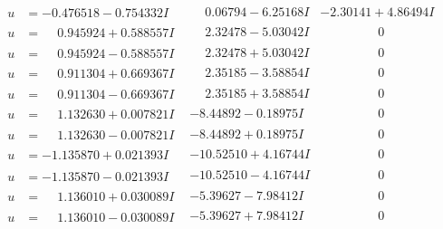 \documentclass[1p]{elsarticle_modified}
\theoremstyle{definition}
\begin{document}
$$\begin{array}{c|c|c}
\begin{aligned}
u &= -0.476518 - 0.754332 I\end{aligned}
 & \phantom{-}0.06794 - 6.25168 I & -2.30141 + 4.86494 I \\ \hline\begin{aligned}
u &= \phantom{-}0.945924 + 0.588557 I\end{aligned}
 & \phantom{-}2.32478 - 5.03042 I & \phantom{-0.000000 } 0 \\ \hline\begin{aligned}
u &= \phantom{-}0.945924 - 0.588557 I\end{aligned}
 & \phantom{-}2.32478 + 5.03042 I & \phantom{-0.000000 } 0 \\ \hline\begin{aligned}
u &= \phantom{-}0.911304 + 0.669367 I\end{aligned}
 & \phantom{-}2.35185 - 3.58854 I & \phantom{-0.000000 } 0 \\ \hline\begin{aligned}
u &= \phantom{-}0.911304 - 0.669367 I\end{aligned}
 & \phantom{-}2.35185 + 3.58854 I & \phantom{-0.000000 } 0 \\ \hline\begin{aligned}
u &= \phantom{-}1.132630 + 0.007821 I\end{aligned}
 & -8.44892 - 0.18975 I & \phantom{-0.000000 } 0 \\ \hline\begin{aligned}
u &= \phantom{-}1.132630 - 0.007821 I\end{aligned}
 & -8.44892 + 0.18975 I & \phantom{-0.000000 } 0 \\ \hline\begin{aligned}
u &= -1.135870 + 0.021393 I\end{aligned}
 & -10.52510 + 4.16744 I & \phantom{-0.000000 } 0 \\ \hline\begin{aligned}
u &= -1.135870 - 0.021393 I\end{aligned}
 & -10.52510 - 4.16744 I & \phantom{-0.000000 } 0 \\ \hline\begin{aligned}
u &= \phantom{-}1.136010 + 0.030089 I\end{aligned}
 & -5.39627 - 7.98412 I & \phantom{-0.000000 } 0 \\ \hline\begin{aligned}
u &= \phantom{-}1.136010 - 0.030089 I\end{aligned}
 & -5.39627 + 7.98412 I & \phantom{-0.000000 } 0 \\ \hline\begin{aligned}

\end{aligned}
\end{array}$$
\end{document}
